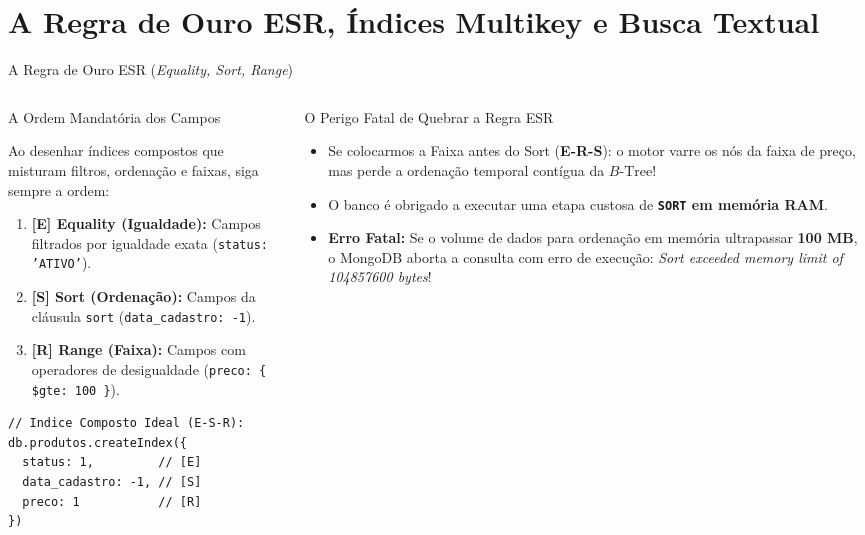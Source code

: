 \section[A Regra de Ouro ESR, Multikey e Texto]{A Regra de Ouro ESR, Índices Multikey e Busca Textual}

\begin{frame}[fragile]{A Regra de Ouro ESR (\textit{Equality, Sort, Range})}
  \vspace{0.05cm}
  \begin{columns}[t,onlytextwidth]
    \begin{column}{0.48\textwidth}
      \alert{A Ordem Mandatória dos Campos}\par
      \scriptsize
      Ao desenhar índices compostos que misturam filtros, ordenação e faixas, siga sempre a ordem:
      \begin{enumerate}
        \item \textbf{[E] Equality (Igualdade):} Campos filtrados por igualdade exata (\texttt{status: 'ATIVO'}).
        \item \textbf{[S] Sort (Ordenação):} Campos da cláusula \texttt{sort} (\texttt{data\_cadastro: -1}).
        \item \textbf{[R] Range (Faixa):} Campos com operadores de desigualdade (\texttt{preco: \{ \$gte: 100 \}}).
      \end{enumerate}
      \begin{lstlisting}[language=mongosh]
// Indice Composto Ideal (E-S-R):
db.produtos.createIndex({
  status: 1,         // [E]
  data_cadastro: -1, // [S]
  preco: 1           // [R]
})
      \end{lstlisting}
    \end{column}
    \begin{column}{0.48\textwidth}
      \alert{O Perigo Fatal de Quebrar a Regra ESR}\par
      \scriptsize
      \begin{itemize}
        \item Se colocarmos a Faixa antes do Sort (\textbf{E-R-S}): o motor varre os nós da faixa de preço, mas perde a ordenação temporal contígua da $B\text{-Tree}$!
        \item O banco é obrigado a executar uma etapa custosa de \textbf{\texttt{SORT} em memória RAM}.
        \item \textbf{Erro Fatal:} Se o volume de dados para ordenação em memória ultrapassar \textbf{100 MB}, o MongoDB aborta a consulta com erro de execução:
          \textit{Sort exceeded memory limit of 104857600 bytes}!
      \end{itemize}
    \end{column}
  \end{columns}
\end{frame}


